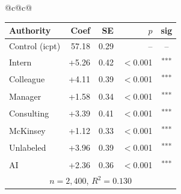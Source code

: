 \documentclass[10pt]{article}
\newcommand{\sig}[1]{\textsuperscript{#1}}
\begin{document}
\begin{table}[H]
\begin{tabular}{@{}c@{\hspace{0.5em}}c@{}}
\begin{minipage}[t]{0.49\textwidth}
\begin{tabular}{@{}l r r r c@{}}
\toprule
Authority & Coef & SE & $p$ & sig \\
\midrule
\cellcolor{gray!22}Control (icpt) & \cellcolor{gray!22}57.18 & \cellcolor{gray!22}0.29 & \cellcolor{gray!22}-- & \cellcolor{gray!22}-- \\
\midrule
Intern & +5.26 & 0.42 & $<$0.001 & \sig{***} \\
Colleague & +4.11 & 0.39 & $<$0.001 & \sig{***} \\
Manager & +1.58 & 0.34 & $<$0.001 & \sig{***} \\
\midrule
Consulting & +3.39 & 0.41 & $<$0.001 & \sig{***} \\
McKinsey & +1.12 & 0.33 & $<$0.001 & \sig{***} \\
\midrule
Unlabeled & +3.96 & 0.39 & $<$0.001 & \sig{***} \\
AI & +2.36 & 0.36 & $<$0.001 & \sig{***} \\
\midrule
\multicolumn{5}{c}{\scriptsize $n=2{,}400$, $R^2=0.130$} \\
\bottomrule\end{tabular}
\end{minipage} \\
\end{tabular}
\end{table}
\end{document}
